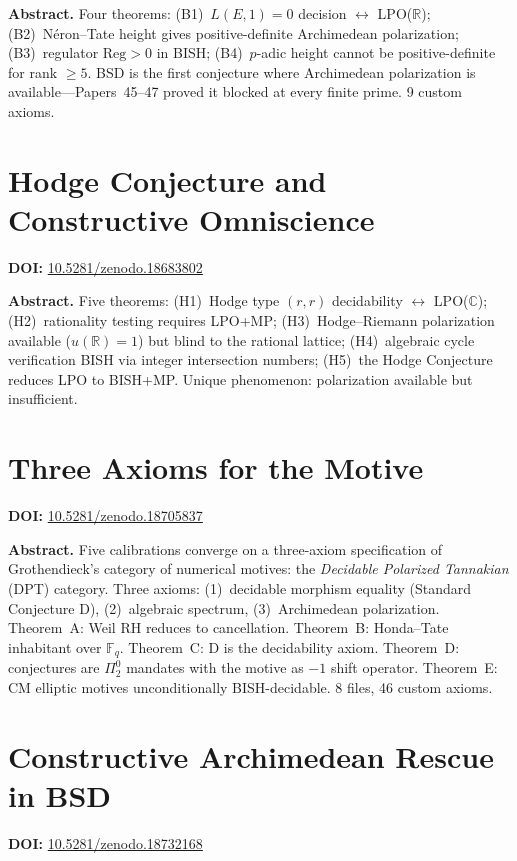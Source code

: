 \documentclass[11pt,a4paper]{article}
\begin{document}
\bigskip
\noindent\textbf{Abstract.}
Four theorems: (B1)~$L(E,1)=0$ decision $\leftrightarrow$ LPO($\mathbb{R}$); (B2)~N\'eron--Tate height gives positive-definite Archimedean polarization; (B3)~regulator $\mathrm{Reg}>0$ in BISH; (B4)~$p$-adic height cannot be positive-definite for rank $\ge5$. BSD is the first conjecture where Archimedean polarization is available---Papers~45--47 proved it blocked at every finite prime. 9 custom axioms.

\section{Hodge Conjecture and Constructive Omniscience}
\label{sec:p49}
\textbf{DOI:} \href{https://doi.org/10.5281/zenodo.18683802}{10.5281/zenodo.18683802}

\bigskip
\noindent\textbf{Abstract.}
Five theorems: (H1)~Hodge type $(r,r)$ decidability $\leftrightarrow$ LPO($\mathbb{C}$); (H2)~rationality testing requires LPO+MP; (H3)~Hodge--Riemann polarization available ($u(\mathbb{R})=1$) but blind to the rational lattice; (H4)~algebraic cycle verification BISH via integer intersection numbers; (H5)~the Hodge Conjecture reduces LPO to BISH+MP. Unique phenomenon: polarization available but insufficient.

\section{Three Axioms for the Motive}
\label{sec:p50}
\textbf{DOI:} \href{https://doi.org/10.5281/zenodo.18705837}{10.5281/zenodo.18705837}

\bigskip
\noindent\textbf{Abstract.}
Five calibrations converge on a three-axiom specification of Grothendieck's category of numerical motives: the \emph{Decidable Polarized Tannakian} (DPT) category. Three axioms: (1)~decidable morphism equality (Standard Conjecture D), (2)~algebraic spectrum, (3)~Archimedean polarization. Theorem~A: Weil RH reduces to cancellation. Theorem~B: Honda--Tate inhabitant over $\mathbb{F}_q$. Theorem~C: D is the decidability axiom. Theorem~D: conjectures are $\Pi_2^0$ mandates with the motive as $-1$ shift operator. Theorem~E: CM elliptic motives unconditionally BISH-decidable. 8 files, 46 custom axioms.

\section{Constructive Archimedean Rescue in BSD}
\label{sec:p51}
\textbf{DOI:} \href{https://doi.org/10.5281/zenodo.18732168}{10.5281/zenodo.18732168}
\end{document}
